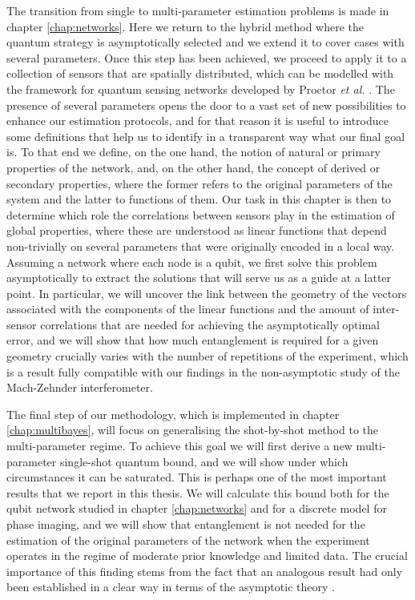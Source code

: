 The transition from single to multi-parameter estimation problems is made in chapter \ref{chap:networks}. Here we return to the hybrid method where the quantum strategy is asymptotically selected and we extend it to cover cases with several parameters. Once this step has been achieved, we proceed to apply it to a collection of sensors that are spatially distributed, which can be modelled with the framework for quantum sensing networks developed by Proctor \emph{et al.} \cite{proctor2017networked, proctor2017networkedshort}. The presence of several parameters opens the door to a vast set of new possibilities to enhance our estimation protocols, and for that reason it is useful to introduce some definitions that help us to identify in a transparent way what our final goal is. To that end we define, on the one hand, the notion of natural or primary properties of the network, and, on the other hand, the concept of derived or secondary properties, where the former refers to the original parameters of the system and the latter to functions of them. Our task in this chapter is then to determine which role the correlations between sensors play in the estimation of global properties, where these are understood as linear functions that depend non-trivially on several parameters that were originally encoded in a local way. Assuming a network where each node is a qubit, we first solve this problem asymptotically to extract the solutions that will serve us as a guide at a latter point. In particular, we will uncover the link between the geometry of the vectors associated with the components of the linear functions and the amount of inter-sensor correlations that are needed for achieving the asymptotically optimal error, and we will show that how much entanglement is required for a given geometry crucially varies with the number of repetitions of the experiment, which is a result fully compatible with our findings in the non-asymptotic study of the Mach-Zehnder interferometer. 

The final step of our methodology, which is implemented in chapter \ref{chap:multibayes}, will focus on generalising the shot-by-shot method to the multi-parameter regime. To achieve this goal we will first derive a new multi-parameter single-shot quantum bound, and we will show under which circumstances it can be saturated. This is perhaps one of the most important results that we report in this thesis. We will calculate this bound both for the qubit network studied in chapter \ref{chap:networks} and for a discrete model for phase imaging, and we will show that entanglement is not needed for the estimation of the original parameters of the network when the experiment operates in the regime of moderate prior knowledge and limited data. The crucial importance of this finding stems from the fact that an analogous result had only been established in a clear way in terms of the asymptotic theory \cite{knott2016local, proctor2017networked, proctor2017networkedshort}. 

